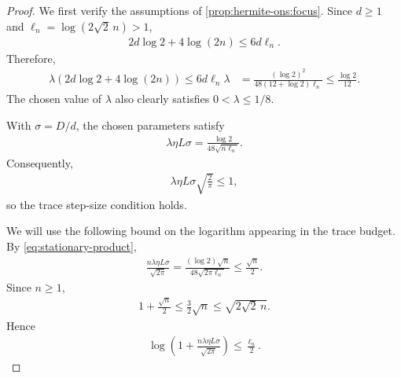 \documentclass{article}
\theoremstyle{plain}
\theoremstyle{definition}
\theoremstyle{plain}
\begin{document}
\begin{proof}
    We first verify the assumptions of
    \cref{prop:hermite-ons:focus}. Since $d\geq1$ and
    $\ell_n=\log(2\sqrt2\,n)>1$,
    \begin{align}
        2d\log2+4\log(2n)
        \leq
        6d\ell_n.
    \end{align}
    Therefore,
    \begin{align}
        \lambda
        \left(
        2d\log2+4\log(2n)
        \right)
        \leq
        6d\ell_n\lambda
         & =
        \frac{(\log2)^2}
        {48(12+\log2)\ell_n}
        \leq
        \frac{\log2}{12}.
    \end{align}
    The chosen value of $\lambda$ also clearly satisfies
    $0<\lambda\leq1/8$.

    With $\sigma=D/d$, the chosen parameters satisfy
    \begin{align}
        \lambda\eta L\sigma
        =
        \frac{\log2}{48\sqrt{n\ell_n}}.
        \label{eq:stationary-product}
    \end{align}
    Consequently,
    \begin{align}
        \lambda\eta L\sigma\sqrt{\frac{2}{\pi}}
        \leq1,
    \end{align}
    so the trace step-size condition holds.

    We will use the following bound on the logarithm appearing in the
    trace budget. By \eqref{eq:stationary-product},
    \begin{align}
        \frac{n\lambda\eta L\sigma}{\sqrt{2\pi}}
        =
        \frac{(\log2)\sqrt n}
        {48\sqrt{2\pi\ell_n}}
        \leq
        \frac{\sqrt n}{2}.
    \end{align}
    Since $n\geq1$,
    \begin{align}
        1+\frac{\sqrt n}{2}
        \leq
        \frac32\sqrt n
        \leq
        \sqrt{2\sqrt2\,n}.
    \end{align}
    Hence
    \begin{align}
        \log\left(
        1+
        \frac{n\lambda\eta L\sigma}{\sqrt{2\pi}}
        \right)
        \leq
        \frac{\ell_n}{2}.
        \label{eq:stationary-log-bound}
    \end{align}


\end{proof}
\end{document}
